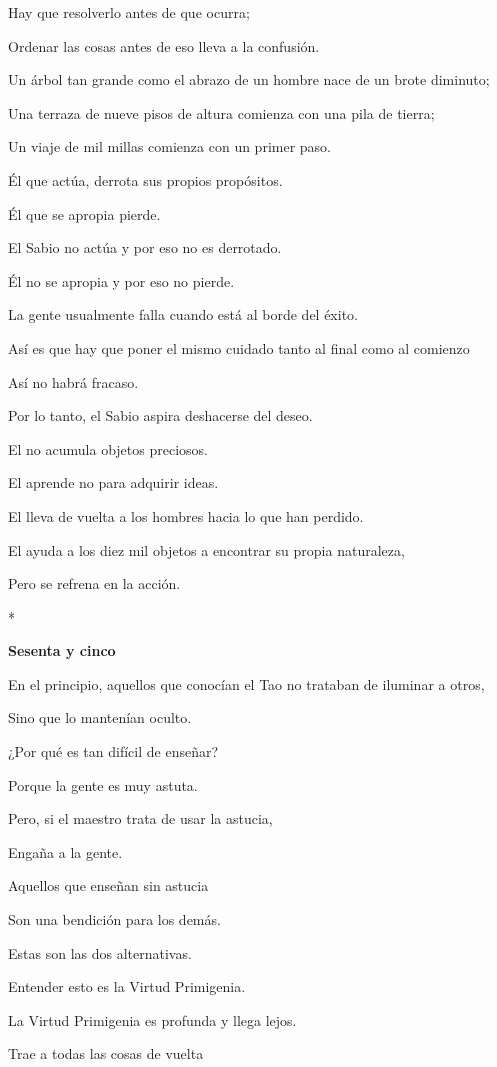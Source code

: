Hay que resolverlo antes de que ocurra;

Ordenar las cosas antes de eso lleva a la confusión.

Un árbol tan grande como el abrazo de un hombre nace de un brote
diminuto;

Una terraza de nueve pisos de altura comienza con una pila de tierra;

Un viaje de mil millas comienza con un primer paso.

Él que actúa, derrota sus propios propósitos.

Él que se apropia pierde.

El Sabio no actúa y por eso no es derrotado.

Él no se apropia y por eso no pierde.

La gente usualmente falla cuando está al borde del éxito.

Así es que hay que poner el mismo cuidado tanto al final como al
comienzo

Así no habrá fracaso.

Por lo tanto, el Sabio aspira deshacerse del deseo.

El no acumula objetos preciosos.

El aprende no para adquirir ideas.

El lleva de vuelta a los hombres hacia lo que han perdido.

El ayuda a los diez mil objetos a encontrar su propia naturaleza,

Pero se refrena en la acción.

*

\textbf{Sesenta y cinco}

En el principio, aquellos que conocían el Tao no trataban de iluminar a
otros,

Sino que lo mantenían oculto.

¿Por qué es tan difícil de enseñar?

Porque la gente es muy astuta.

Pero, si el maestro trata de usar la astucia,

Engaña a la gente.

Aquellos que enseñan sin astucia

Son una bendición para los demás.

Estas son las dos alternativas.

Entender esto es la Virtud Primigenia.

La Virtud Primigenia es profunda y llega lejos.

Trae a todas las cosas de vuelta

